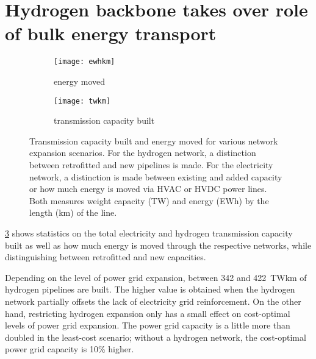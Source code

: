 
\section*{Hydrogen backbone takes over role of bulk energy transport}
\label{sec:energy-moved}

\begin{figure}
    \centering
        \begin{subfigure}[t]{0.49\textwidth}
            \centering
            \caption{energy moved}
            \texttt{[image: ewhkm]}
            \label{fig:network-stats:ewhkm}
        \end{subfigure}
        \begin{subfigure}[t]{0.49\textwidth}
            \centering
            \caption{transmission capacity built}
            \texttt{[image: twkm]}
            \label{fig:network-stats:twkm}
        \end{subfigure}
    \caption{Transmission capacity built and energy moved for various network
        expansion scenarios. For the hydrogen network, a distinction between
        retrofitted and new pipelines is made. For the electricity network, a
        distinction is made between existing and added capacity or how much
        energy is moved via HVAC or HVDC power lines. Both measures weight
        capacity (TW) and energy (EWh) by the length (km) of the line.}
    \label{fig:network-stats}
\end{figure}

\cref{fig:network-stats} shows statistics on the total electricity and hydrogen
transmission capacity built as well as how much energy is moved through the
respective networks, while distinguishing between retrofitted and new
capacities.


Depending on the level of power grid expansion, between 342 and 422~TWkm of
hydrogen pipelines are built. The higher value is obtained when the hydrogen
network partially offsets the lack of electricity grid reinforcement. On the
other hand, restricting hydrogen expansion only has a small effect on
cost-optimal levels of power grid expansion. The power grid capacity is a little
more than doubled in the least-cost scenario; without a hydrogen network, the
cost-optimal power grid capacity is 10\% higher.

